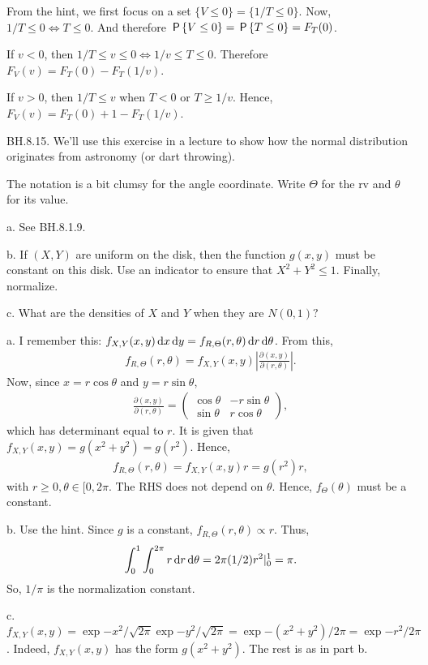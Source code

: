 \begin{exercise}
\begin{solution}
From the hint, we first focus on a set $\{V\leq 0\} = \{1/T \leq 0\}$. Now,  $1/T\leq 0 \iff T\leq 0$. And therefore $\P{V\leq 0} = \P{T\leq 0} = F_T(0)$.

If $v<0$, then $1/T \leq v \leq 0\iff 1/v \leq T \leq 0$. Therefore
$F_V(v) = F_T(0) - F_T(1/v)$.

If $v>0$, then $1/T \leq v$ when $T<0$ or $T\geq 1/v$. Hence,
$F_V(v) = F_T(0) + 1- F_T(1/v)$.
\end{solution}
\end{exercise}

\begin{exercise} BH.8.15. We'll use this exercise in a lecture to show how the normal distribution originates from astronomy (or dart throwing).

The notation is a bit clumsy for the angle coordinate. Write $\Theta$ for the rv and $\theta$ for its value.
\begin{hint}
a. See BH.8.1.9.

b. If $(X,Y)$ are uniform on the disk, then the function $g(x,y)$ must be constant on this disk. Use an indicator to ensure that $X^2+Y^2\leq 1$. Finally, normalize.

c. What are the densities of $X$ and $Y$ when they are $N(0,1)?$
\end{hint}

\begin{solution}
a.  I remember this: $f_{X,Y}(x,y) \d x \d y = f_{R, \Theta}(r, \theta) \d r \d \theta$. From this,
\begin{align*}
f_{R, \Theta}(r, \theta)  = f_{X,Y}(x,y) \left| \frac{\partial (x,y)}{\partial(r, \theta)} \right|.
\end{align*}
Now, since $x=r\cos \theta$ and $y=r \sin \theta$,
\begin{align*}
\frac{\partial (x,y)}{\partial(r, \theta)} =
  \begin{pmatrix}
    \cos \theta & -r \sin \theta \\
 \sin \theta & r \cos \theta
  \end{pmatrix},
\end{align*}
which has determinant equal to $r$.
It is given that $f_{X,Y}(x,y)=g(x^2+y^2) = g(r^2)$. Hence,
\begin{align*}
f_{R, \Theta}(r, \theta)  = f_{X,Y}(x,y) r = g(r^2)r,
\end{align*}
with $r\geq 0, \theta\in[0, 2\pi$.
The RHS  does not  depend on $\theta$. Hence, $f_{\Theta}(\theta)$ must be a constant.

b. Use the hint. Since $g$ is a constant, $f_{R, \Theta}(r, \theta) \propto r$. Thus,
\begin{align*}
  \int_{0}^{1}\int_{0}^{2\pi} r \d r \d \theta = 2\pi (1/2) r^{2}|_0^{1} = \pi.
\end{align*}
So, $1/\pi$ is the normalization constant.

c. $f_{X,Y}(x,y) = \exp{-x^2}/\sqrt{2\pi}\exp{-y^{2}}/\sqrt{2\pi} = \exp{-(x^2+y^2)/2\pi} = \exp{-r^{2}}/2\pi$. Indeed, $f_{X,Y}(x,y)$ has the form $g(x^2+y^2)$. The rest is as in part b.
\end{solution}
\end{exercise}

